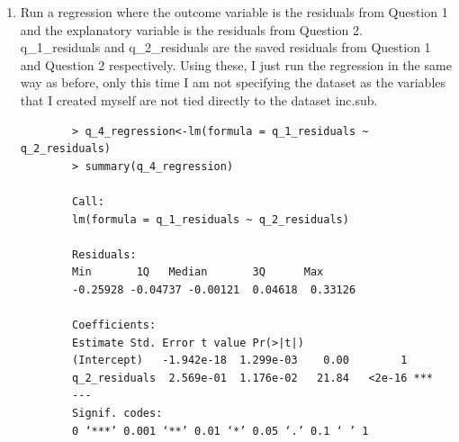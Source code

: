 \documentclass[12pt,letterpaper]{article}
\begin{document}
	\begin{enumerate}
		\item Run a regression where the outcome variable is the residuals from Question 1 and the explanatory variable is the residuals from Question 2. \\
		q\_1\_residuals and q\_2\_residuals are the saved residuals from Question 1 and Question 2 respectively. Using these, I just run the regression in the same way as before, only this time I am not specifying the dataset as the variables that I created myself are not tied directly to the dataset inc.sub.
			\begin{verbatim}
		> q_4_regression<-lm(formula = q_1_residuals ~ q_2_residuals)
		> summary(q_4_regression)
		
		Call:
		lm(formula = q_1_residuals ~ q_2_residuals)
		
		Residuals:
		Min       1Q   Median       3Q      Max 
		-0.25928 -0.04737 -0.00121  0.04618  0.33126 
		
		Coefficients:
		Estimate Std. Error t value Pr(>|t|)    
		(Intercept)   -1.942e-18  1.299e-03    0.00        1    
		q_2_residuals  2.569e-01  1.176e-02   21.84   <2e-16 ***
		---
		Signif. codes:  
		0 ‘***’ 0.001 ‘**’ 0.01 ‘*’ 0.05 ‘.’ 0.1 ‘ ’ 1
		

\end{verbatim}
\end{enumerate}
\end{document}
